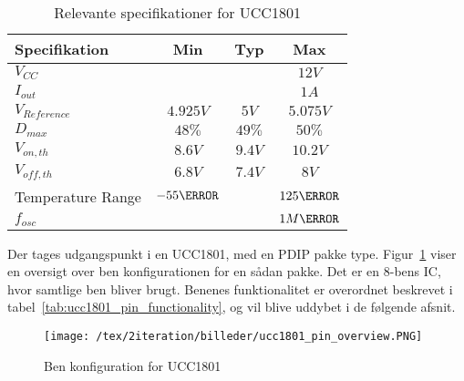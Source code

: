 \begin{table}[H] 			
	\centering
	\begin{tabularx}{\textwidth}{|X|c|c|c|} 
		\hline
		\textbf{Specifikation} & \textbf{Min} & \textbf{Typ} & \textbf{Max} \\ \hline
		$V_{CC}$ &  &  & $12V$ \\ \hline
		$I_{out}$ &  &  & $1A$ \\ \hline
		$V_{Reference}$ & $4.925V$ & $5V$ & $5.075V$ \\ \hline
		$D_{max}$ & $48\percent$ & $49\percent$ & $50\percent$ \\ \hline
		$V_{on,th}$ & $8.6V$ & $9.4V$ & $10.2V$ \\ \hline
		$V_{off,th}$ & $6.8V$ & $7.4V$ & $8V$ \\ \hline
		Temperature Range & $-55\degreeCelsius$ &  & $125\degreeCelsius$ \\ \hline
		$f_{osc}$ & & & $1M\hertz$ \\ \hline
	\end{tabularx}

	\caption{Relevante specifikationer for UCC1801}
	\label{tab:ucc1801_specs}
\end{table}

Der tages udgangspunkt i en UCC1801, med en PDIP pakke type. Figur~\ref{fig:ucc1801_pin_overview} viser en oversigt over ben konfigurationen for en sådan pakke. Det er en 8-bens IC, hvor samtlige ben bliver brugt. Benenes funktionalitet er overordnet beskrevet i tabel~\ref{tab:ucc1801_pin_functionality}, og vil blive uddybet i de følgende afsnit.

\begin{figure}[H]
	\center
	\texttt{[image: /tex/2iteration/billeder/ucc1801\_pin\_overview.PNG]}
	\caption{Ben konfiguration for UCC1801}
	\label{fig:ucc1801_pin_overview}
\end{figure}

